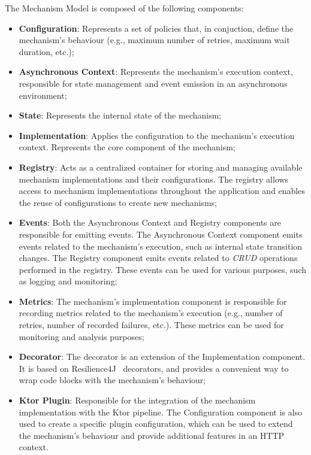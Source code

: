 The Mechanism Model is composed of the following components:
\begin{itemize}
    \item \textbf{Configuration}: Represents a set of policies that, in conjuction, define the mechanism's behaviour (e.g., maximum number of retries, maximum wait duration, etc.);
    \item \textbf{Asynchronous Context}: Represents the mechanism's execution context, responsible for state management and event emission in an asynchronous environment;
    \item \textbf{State}: Represents the internal state of the mechanism;
    \item \textbf{Implementation}: Applies the configuration to the mechanism's execution context.
    Represents the core component of the mechanism;
    \item \textbf{Registry}: Acts as a centralized container for storing and managing available mechanism implementations and their configurations.
    The registry allows access to mechanism implementations throughout the application and enables the reuse of configurations to create new mechanisms;
    \item \textbf{Events}: Both the Asynchronous Context and Registry components are responsible for emitting events.
    The Asynchronous Context component emits events related to the mechanism's execution, such as internal state transition changes.
    The Registry component emits events related to \textit{CRUD} operations performed in the registry.
    These events can be used for various purposes, such as logging and monitoring;
    \item \textbf{Metrics}: The mechanism's implementation component is responsible for recording metrics related to the mechanism's execution (e.g., number of retries, number of recorded failures, etc.).
    These metrics can be used for monitoring and analysis purposes;
    \item \textbf{Decorator}: The decorator is an extension of the Implementation component.
    It is based on Resilience4J~\cite{resilience4j} decorators, and provides a convenient way to wrap code blocks with the mechanism's behaviour;
    \item \textbf{Ktor Plugin}: Responsible for the integration of the mechanism implementation with the Ktor pipeline.
    The Configuration component is also used to create a specific plugin configuration,
    which can be used to extend the mechanism's behaviour and provide additional features in an HTTP context.
\end{itemize}

